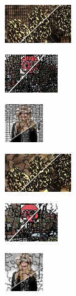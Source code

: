 \begin{figure}
	\begin{subfigure}[b]{0.16\textwidth}
		\includegraphics[height=1.65cm]{pictures/bsds500/rw/cropped/rw_208078_contours}
	\end{subfigure}
	\begin{subfigure}[b]{0.129\textwidth}
		\includegraphics[height=1.65cm]{pictures/sbd/rw/cropped/rw_6000067_contours}
	\end{subfigure}
	\begin{subfigure}[b]{0.10\textwidth}
		\includegraphics[height=1.65cm]{pictures/fash/rw/cropped/rw_132_contours}
	\end{subfigure}
	\begin{subfigure}[b]{0.02\textwidth}
	\end{subfigure}
	\begin{subfigure}[b]{0.16\textwidth}
		\includegraphics[height=1.65cm]{pictures/bsds500/qs/cropped/qs_208078_contours}
	\end{subfigure}
	\begin{subfigure}[b]{0.129\textwidth}
		\includegraphics[height=1.65cm]{pictures/sbd/qs/cropped/qs_6000067_contours}
	\end{subfigure}
	\begin{subfigure}[b]{0.10\textwidth}
		\includegraphics[height=1.65cm]{pictures/fash/qs/cropped/qs_132_contours}

\end{subfigure}
\end{figure}
